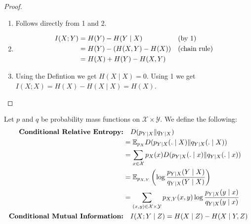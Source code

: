 \begin{proof}
\begin{enumerate}
\begin{align*}
                        &= D(p_{Y,X} \| p_Y p_X) = I(Y; X)
            \end{align*}
        \item Follows directly from 1 and 2.
        \item \begin{align*}
                I(X; Y) &= H(Y) - H(Y \mid X)               && \text{(by 1)} \\
                        &= H(Y) - \left(H(X, Y) - H(X)\right)    && \text{(chain rule)} \\
                        &= H(X) + H(Y) - H(X, Y)
            \end{align*}
        \item Using the Defintion we get $H(X \mid X) = 0$. Using 1 we get $I(X; X) = H(X) - H(X \mid X) = H(X)$.
    \end{enumerate}
\end{proof}

\begin{definition}\label{def:conditional-entropy-mutual}
    Let $p$ and $q$ be probability mass functions on $\mathcal{X} \times \mathcal{Y}$.
    We define the following:
    \begin{align*}
        \textbf{Conditional Relative Entropy:}    & \quad D(p_{Y \mid X} \| q_{Y \mid X}) \\
        &= \mathbb{E}_{p_X} D(p_{Y \mid X}(. \mid X) \| q_{Y \mid X}(. \mid X)) \\
        &= \sum_{x \in \mathcal{X}}{p_X(x) D(p_{Y \mid X}(. \mid x) \| q_{Y \mid X}(. \mid x))} \\
	    &= \mathbb{E}_{p_{X,Y}}\left(\log \frac{p_{Y \mid X}(Y \mid X)}{q_{Y \mid X}(Y \mid X)}\right) \\
        &= \sum_{(x, y) \in \mathcal{X} \times \mathcal{Y}}{p_{X,Y}(x, y) \log \frac{p_{Y \mid X}(y \mid x)}{q_{Y \mid X}(y \mid x)}} \\
        \textbf{Conditional Mutual Information:}  & \quad I(X; Y \mid Z) 
        = H(X \mid Z) - H(X \mid Y, Z)
    \end{align*}
\end{definition}

